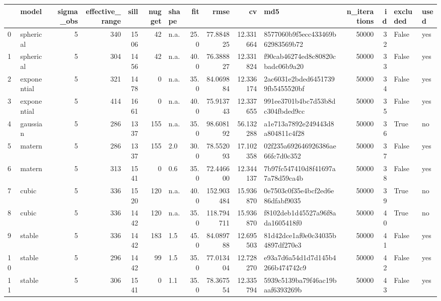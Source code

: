 \begin{tabular}{llrrrrlrrrlrrll}
\toprule
{} &        model &  sigma\_obs &  effective\_range &  sill &  nugget & shape &   fit &        rmse &         cv &                               md5 &  n\_iterations &  id &  excluded & used \\
\midrule
0  &    spherical &          5 &              340 &  1506 &      42 &  n.a. &  25.0 &   77.884825 &  12.331664 &  8577060b9f5ecc433469b62983569b72 &         50000 &  32 &     False &  yes \\
1  &    spherical &          5 &              304 &  1456 &      42 &  n.a. &  40.0 &   76.388827 &  12.331824 &  f90cab46274ed8c80820cbadc06b9a20 &         50000 &  33 &     False &  yes \\
2  &  exponential &          5 &              321 &  1478 &       0 &  n.a. &  35.0 &   84.069884 &  12.336174 &  2ac6031e2bded64517399fb5455520bf &         50000 &  34 &     False &  yes \\
3  &  exponential &          5 &              414 &  1661 &       0 &  n.a. &  40.0 &   75.913743 &  12.337655 &  991ee3701b4bc7d53b8dc304fbded9cc &         50000 &  35 &     False &  yes \\
4  &     gaussian &          5 &              286 &  1337 &     155 &  n.a. &  35.0 &   98.608192 &  56.132288 &  a1e713a7892e249443d8a804811c4f28 &         50000 &  36 &      True &   no \\
5  &       matern &          5 &              286 &  1337 &     155 &   2.0 &  30.0 &   78.552093 &  17.102358 &  02f235a692646926386ae66fc7d0c352 &         50000 &  37 &     False &  yes \\
6  &       matern &          5 &              313 &  1541 &       0 &   0.6 &  35.0 &   72.446600 &  12.344137 &  7b97fc547410d8f41697a7a78d59ca4b &         50000 &  38 &     False &  yes \\
7  &        cubic &          5 &              336 &  1520 &     120 &  n.a. &  40.0 &  152.903484 &  15.936870 &  0e7503c0f35e4bcf2ed6e86dfabf9035 &         50000 &  39 &      True &   no \\
8  &        cubic &          5 &              336 &  1442 &     120 &  n.a. &  35.0 &  118.794711 &  15.936870 &  f8102deb1d45527a96f8ada1605418f0 &         50000 &  40 &      True &   no \\
9  &       stable &          5 &              336 &  1442 &     183 &   1.5 &  45.0 &   84.089788 &  12.695503 &  81d42dce1af0e0c34035b4897df270e3 &         50000 &  41 &     False &  yes \\
10 &       stable &          5 &              296 &  1442 &      99 &   1.5 &  35.0 &   77.013404 &  12.728270 &  e93a7d6a54d1d7d145b4266b474742c9 &         50000 &  42 &     False &  yes \\
11 &       stable &          5 &              306 &  1541 &       0 &   1.1 &  35.0 &   78.367554 &  12.335794 &  5939c5139ba79f46ac19baaf6393269b &         50000 &  43 &     False &  yes \\
\bottomrule
\end{tabular}
